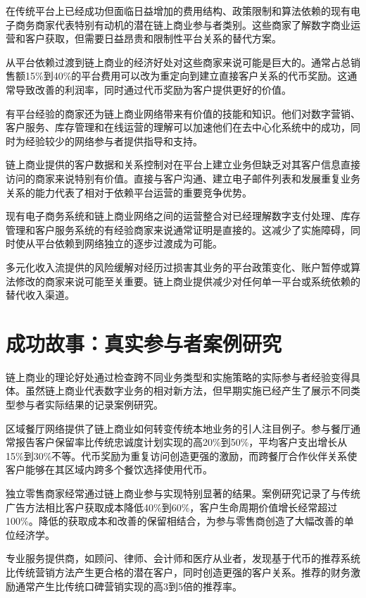 \documentclass[
  Letterpaper,
]{scrbook}
\begin{document}
在传统平台上已经成功但面临日益增加的费用结构、政策限制和算法依赖的现有电子商务商家代表特别有动机的潜在链上商业参与者类别。这些商家了解数字商业运营和客户获取，但需要日益昂贵和限制性平台关系的替代方案。

从平台依赖过渡到链上商业的经济好处对这些商家来说可能是巨大的。通常占总销售额15\%到40\%的平台费用可以改为重定向到建立直接客户关系的代币奖励。这通常导致改善的利润率，同时通过代币奖励为客户提供更好的价值。

有平台经验的商家还为链上商业网络带来有价值的技能和知识。他们对数字营销、客户服务、库存管理和在线运营的理解可以加速他们在去中心化系统中的成功，同时为经验较少的网络参与者提供指导和支持。

链上商业提供的客户数据和关系控制对在平台上建立业务但缺乏对其客户信息直接访问的商家来说特别有价值。直接与客户沟通、建立电子邮件列表和发展重复业务关系的能力代表了相对于依赖平台运营的重要竞争优势。

现有电子商务系统和链上商业网络之间的运营整合对已经理解数字支付处理、库存管理和客户服务系统的有经验商家来说通常证明是直接的。这减少了实施障碍，同时使从平台依赖到网络独立的逐步过渡成为可能。

多元化收入流提供的风险缓解对经历过损害其业务的平台政策变化、账户暂停或算法修改的商家来说可能至关重要。链上商业提供减少对任何单一平台或系统依赖的替代收入渠道。

\section{成功故事：真实参与者案例研究}\label{ux6210ux529fux6545ux4e8bux771fux5b9eux53c2ux4e0eux8005ux6848ux4f8bux7814ux7a76}

链上商业的理论好处通过检查跨不同业务类型和实施策略的实际参与者经验变得具体。虽然链上商业代表数字业务的相对新方法，但早期实施已经产生了展示不同类型参与者实际结果的记录案例研究。

区域餐厅网络提供了链上商业如何转变传统本地业务的引人注目例子。参与餐厅通常报告客户保留率比传统忠诚度计划实现的高20\%到50\%，平均客户支出增长从15\%到30\%不等。代币奖励为重复访问创造更强的激励，而跨餐厅合作伙伴关系使客户能够在其区域内跨多个餐饮选择使用代币。

独立零售商家经常通过链上商业参与实现特别显著的结果。案例研究记录了与传统广告方法相比客户获取成本降低40\%到60\%，客户生命周期价值增长经常超过100\%。降低的获取成本和改善的保留相结合，为参与零售商创造了大幅改善的单位经济学。

专业服务提供商，如顾问、律师、会计师和医疗从业者，发现基于代币的推荐系统比传统营销方法产生更合格的潜在客户，同时创造更强的客户关系。推荐的财务激励通常产生比传统口碑营销实现的高3到5倍的推荐率。
\end{document}
